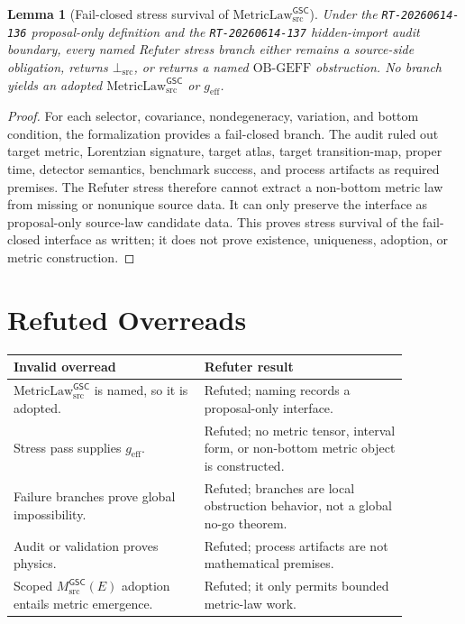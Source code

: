 \documentclass[11pt]{article}
\newcommand{\MsrcGSC}{M_{\mathrm{src}}^{\mathsf{GSC}}}
\newcommand{\MetricLaw}{\mathrm{MetricLaw}_{\mathrm{src}}^{\mathsf{GSC}}}
\newcommand{\BottomSrc}{\bot_{\mathrm{src}}}
\newcommand{\geff}{g_{\mathrm{eff}}}
\newtheorem{lemma}{Lemma}
\begin{document}
\begin{lemma}[Fail-closed stress survival of \(\MetricLaw\)]
Under the \texttt{RT-20260614-136} proposal-only definition and the
\texttt{RT-20260614-137} hidden-import audit boundary, every named Refuter
stress branch either remains a source-side obligation, returns \(\BottomSrc\),
or returns a named \(\mathrm{OB\mbox{-}GEFF}\) obstruction. No branch yields an
adopted \(\MetricLaw\) or \(\geff\).
\end{lemma}

\begin{proof}
For each selector, covariance, nondegeneracy, variation, and bottom condition,
the formalization provides a fail-closed branch. The audit ruled out target
metric, Lorentzian signature, target atlas, target transition-map, proper time,
detector semantics, benchmark success, and process artifacts as required
premises. The Refuter stress therefore cannot extract a non-bottom metric law
from missing or nonunique source data. It can only preserve the interface as
proposal-only source-law candidate data. This proves stress survival of the
fail-closed interface as written; it does not prove existence, uniqueness,
adoption, or metric construction.
\end{proof}

\section{Refuted Overreads}

\begin{center}
\begin{tabular}{p{0.42\linewidth}p{0.45\linewidth}}
\toprule
Invalid overread & Refuter result \\
\midrule
\(\MetricLaw\) is named, so it is adopted. & Refuted; naming records a
proposal-only interface. \\
Stress pass supplies \(\geff\). & Refuted; no metric tensor, interval form, or
non-bottom metric object is constructed. \\
Failure branches prove global impossibility. & Refuted; branches are local
obstruction behavior, not a global no-go theorem. \\
Audit or validation proves physics. & Refuted; process artifacts are not
mathematical premises. \\
Scoped \(\MsrcGSC(E)\) adoption entails metric emergence. & Refuted; it only
permits bounded metric-law work. \\
\bottomrule
\end{tabular}
\end{center}
\end{document}
